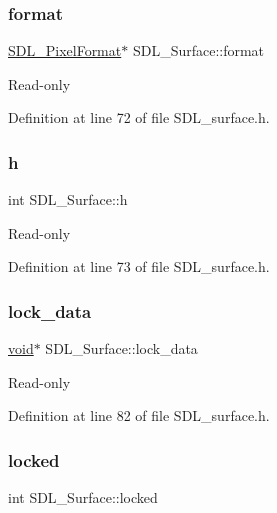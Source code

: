 \subsubsection{\texorpdfstring{format}{format}}
{\footnotesize\ttfamily \mbox{\hyperlink{struct_s_d_l___pixel_format}{S\+D\+L\+\_\+\+Pixel\+Format}}$\ast$ S\+D\+L\+\_\+\+Surface\+::format}

Read-\/only 

Definition at line 72 of file S\+D\+L\+\_\+surface.\+h.

\mbox{\label{struct_s_d_l___surface_af33bcf87a1f5e10a99b3c7e8626b38c8}} 
\subsubsection{\texorpdfstring{h}{h}}
{\footnotesize\ttfamily int S\+D\+L\+\_\+\+Surface\+::h}

Read-\/only 

Definition at line 73 of file S\+D\+L\+\_\+surface.\+h.

\mbox{\label{struct_s_d_l___surface_a0afacfb933b54a9af0846a307a6924fb}} 
\subsubsection{\texorpdfstring{lock\_data}{lock\_data}}
{\footnotesize\ttfamily \mbox{\hyperlink{_s_d_l__opengles2__gl2ext_8h_ae5d8fa23ad07c48bb609509eae494c95}{void}}$\ast$ S\+D\+L\+\_\+\+Surface\+::lock\+\_\+data}

Read-\/only 

Definition at line 82 of file S\+D\+L\+\_\+surface.\+h.

\mbox{\label{struct_s_d_l___surface_a5022edaeea1c0a055fa5d6dccba41de2}} 
\subsubsection{\texorpdfstring{locked}{locked}}
{\footnotesize\ttfamily int S\+D\+L\+\_\+\+Surface\+::locked}

